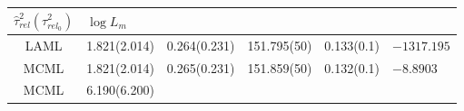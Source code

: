 \documentclass[12pt,a4paper,UTF8,twoside]{book}
\theoremstyle{definition}
\theoremstyle{definition}
\theoremstyle{definition}
\theoremstyle{remark}
\begin{document}
\begin{longtable}[]{@{}clllll@{}}
\begin{minipage}[b]{0.15\columnwidth}
\(\hat{\tau}^2_{rel}(\tau^2_{rel_0})\)\strut
\end{minipage} & \begin{minipage}[b]{0.15\columnwidth}\raggedright
\(\log L_{m}\)\strut
\end{minipage}\tabularnewline
\midrule
\endhead
\begin{minipage}[t]{0.09\columnwidth}\centering
LAML\strut
\end{minipage} & \begin{minipage}[t]{0.15\columnwidth}\raggedright
1.821(2.014)\strut
\end{minipage} & \begin{minipage}[t]{0.15\columnwidth}\raggedright
0.264(0.231)\strut
\end{minipage} & \begin{minipage}[t]{0.15\columnwidth}\raggedright
151.795(50)\strut
\end{minipage} & \begin{minipage}[t]{0.15\columnwidth}\raggedright
0.133(0.1)\strut
\end{minipage} & \begin{minipage}[t]{0.15\columnwidth}\raggedright
\(-1317.195\)\strut
\end{minipage}\tabularnewline
\begin{minipage}[t]{0.09\columnwidth}\centering
MCML\strut
\end{minipage} & \begin{minipage}[t]{0.15\columnwidth}\raggedright
1.821(2.014)\strut
\end{minipage} & \begin{minipage}[t]{0.15\columnwidth}\raggedright
0.265(0.231)\strut
\end{minipage} & \begin{minipage}[t]{0.15\columnwidth}\raggedright
151.859(50)\strut
\end{minipage} & \begin{minipage}[t]{0.15\columnwidth}\raggedright
0.132(0.1)\strut
\end{minipage} & \begin{minipage}[t]{0.15\columnwidth}\raggedright
\(-8.8903\)\strut
\end{minipage}\tabularnewline
\begin{minipage}[t]{0.09\columnwidth}\centering
MCML\strut
\end{minipage} & \begin{minipage}[t]{0.15\columnwidth}\raggedright
6.190(6.200)\strut
\end{minipage} & \begin{minipage}[t]{0.15\columnwidth}\raggedright

\end{minipage}
\end{longtable}
\end{document}

